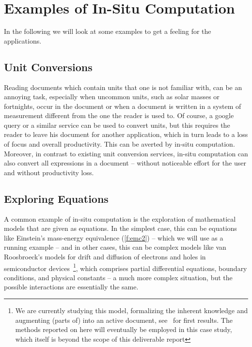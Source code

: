 \section{Examples of In-Situ Computation}\label{sec:examples}

In the following we will look at some examples to get a feeling for the applications.

\subsection{Unit Conversions}\label{sec:units}
Reading documents which contain units that one is not familiar with, can be an annoying
task, especially when uncommon units, such as solar masses or fortnights, occur in the
document or when a document is written in a system of measurement different from the one
the reader is used to.  Of course, a google query or a similar service can be used to
convert units, but this requires the reader to leave his document for another application,
which in turn leads to a loss of focus and overall productivity.  This can be averted by
in-situ computation. Moreover, in contrast to existing unit conversion services, in-situ
computation can also convert all expressions in a document -- without noticeable effort
for the user and without productivity loss.


\subsection{Exploring Equations}\label{sec:equations}

A common example of in-situ computation is the exploration of mathematical models that are
given as equations. In the simplest case, this can be equations like Einstein's
mass-energy equivalence (\ref{f:emc2}) -- which we will use as a running example -- and in
other cases, this can be complex models like van Roosbroeck's models for drift and
diffusion of electrons and holes in semiconductor devices~\cite{FarRotDoa:nmddm16}\footnote{We
  are currently studying this model, formalizing the inherent knowledge and augmenting
  (parts of) \cite{FarRotDoa:nmddm16} into an active document, see~\cite{KohKopMueTab:RCS} for
  first results. The methods reported on here will eventually be employed in this case
  study, which itself is beyond the scope of this deliverable report}, which comprises
partial differential equations, boundary conditions, and physical constants -- a much more
complex situation, but the possible interactions are essentially the same. 

